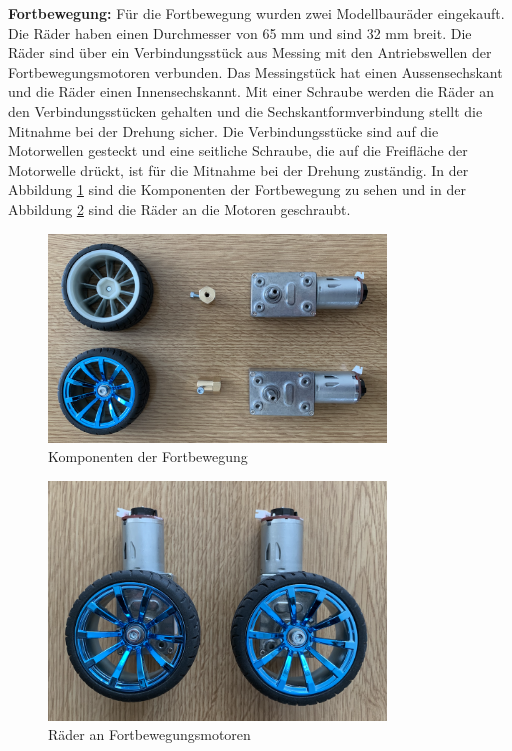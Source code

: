 \textbf{Fortbewegung:} Für die Fortbewegung wurden zwei Modellbauräder eingekauft. Die Räder haben einen Durchmesser von 65 mm und sind 32 mm breit. Die Räder sind über ein Verbindungsstück aus Messing mit den Antriebswellen der Fortbewegungsmotoren verbunden. Das Messingstück hat einen Aussensechskant und die Räder einen Innensechskannt. Mit einer Schraube werden die Räder an den Verbindungsstücken gehalten und die Sechskantformverbindung stellt die Mitnahme bei der Drehung sicher. Die Verbindungsstücke sind auf die Motorwellen gesteckt und eine seitliche Schraube, die auf die Freifläche der Motorwelle drückt, ist für die Mitnahme bei der Drehung zuständig. In der Abbildung \ref{fig:Komponenten der Fortbewegung} sind die Komponenten der Fortbewegung zu sehen und in der Abbildung \ref{fig:Räder an Fortbewegungsmotoren} sind die Räder an die Motoren geschraubt.

\begin{figure}[H]
  \includegraphics[width=0.8\textwidth]{img/Gerät Aufbau/Räder zerlegt.png}
  \centering
  \caption{Komponenten der Fortbewegung}
  \label{fig:Komponenten der Fortbewegung}
\end{figure}

\begin{figure}[H]
  \includegraphics[width=0.8\textwidth]{img/Gerät Aufbau/Räder mit Motor.png}
  \centering
  \caption{Räder an Fortbewegungsmotoren}
  \label{fig:Räder an Fortbewegungsmotoren}
\end{figure}

